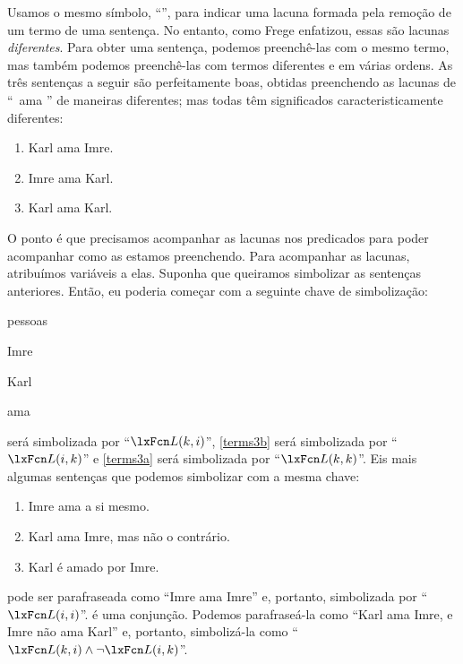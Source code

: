 Usamos o mesmo símbolo, \textquotedblleft \blank\textquotedblright{}, para indicar uma lacuna formada pela remoção de um termo de uma sentença. No entanto, como \foreignlanguage{german}{Frege} enfatizou, essas são lacunas \emph{diferentes}. Para obter uma sentença, podemos preenchê-las com o mesmo termo, mas também podemos preenchê-las com termos diferentes e em várias ordens. As três sentenças a seguir são perfeitamente boas, obtidas preenchendo as lacunas de \textquotedblleft \blank\ ama \blank{}\textquotedblright{} de maneiras diferentes; mas todas têm significados caracteristicamente diferentes:
\begin{enumerate}
\item\label{terms3} Karl ama Imre.
\item\label{terms3b} Imre ama Karl.
\item\label{terms3a} Karl ama Karl.
\end{enumerate}
O ponto é que precisamos acompanhar as lacunas nos predicados para poder acompanhar como as estamos preenchendo. Para acompanhar as lacunas, atribuímos variáveis a elas. Suponha que queiramos simbolizar as sentenças anteriores. Então, eu poderia começar com a seguinte chave de simbolização:
	\begin{ekey}
\item[\text{domínio}] pessoas
		\item[i] Imre
		\item[k] Karl
\item[\atom{L}{x,y}]  ama 
	\end{ekey}
 será simbolizada por \textquotedblleft $\atom{L}{k,i}$\textquotedblright{}, \cref*{terms3b} será simbolizada por \textquotedblleft $\atom{L}{i,k}$\textquotedblright{} e \cref*{terms3a} será simbolizada por \textquotedblleft $\atom{L}{k,k}$\textquotedblright{}. Eis mais algumas sentenças que podemos simbolizar com a mesma chave:
\begin{enumerate}
\item\label{terms4} Imre ama a si mesmo.
\item\label{terms5} Karl ama Imre, mas não o contrário.
\item\label{terms6} Karl é amado por Imre.
\end{enumerate}
 pode ser parafraseada como \textquotedblleft Imre ama Imre\textquotedblright{} e, portanto, simbolizada por \textquotedblleft $\atom{L}{i,i}$\textquotedblright{}.  é uma conjunção. Podemos parafraseá-la como \textquotedblleft Karl ama Imre, e Imre não ama Karl\textquotedblright{} e, portanto, simbolizá-la como \textquotedblleft $\atom{L}{k,i} \eand \enot \atom{L}{i,k}$\textquotedblright{}.



